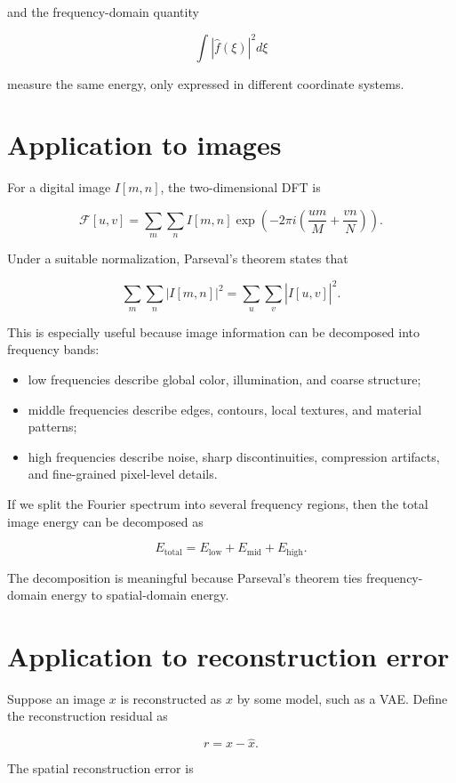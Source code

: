 and the frequency-domain quantity

\[
\int |\widehat{f}(\xi)|^2d\xi
\]

measure the same energy, only expressed in different coordinate systems.

\section{Application to images}

For a digital image \(I[m,n]\), the two-dimensional DFT is

\[
\mathcal{F}[u,v]
=
\sum_m
\sum_n
I[m,n]
\exp\left(
-2\pi i
\left(
\frac{um}{M}
+
\frac{vn}{N}
\right)
\right).
\]

Under a suitable normalization, Parseval’s theorem states that

\[
\sum_m
\sum_n
|I[m,n]|^2
=
\sum_u
\sum_v
|\widehat{I}[u,v]|^2.
\]

This is especially useful because image information can be decomposed into frequency bands:

\begin{itemize}
  \item low frequencies describe global color, illumination, and coarse structure;
  \item middle frequencies describe edges, contours, local textures, and material patterns;
  \item high frequencies describe noise, sharp discontinuities, compression artifacts, and fine-grained pixel-level details.
\end{itemize}

If we split the Fourier spectrum into several frequency regions, then the total image energy can be decomposed as

\[
E_{\mathrm{total}}
=
E_{\mathrm{low}}
+
E_{\mathrm{mid}}
+
E_{\mathrm{high}}.
\]

The decomposition is meaningful because Parseval’s theorem ties frequency-domain energy to spatial-domain energy.

\section{Application to reconstruction error}

Suppose an image \(x\) is reconstructed as \(\hat{x}\) by some model, such as a VAE. Define the reconstruction residual as

\[
r
=
x-\hat{x}.
\]

The spatial reconstruction error is

